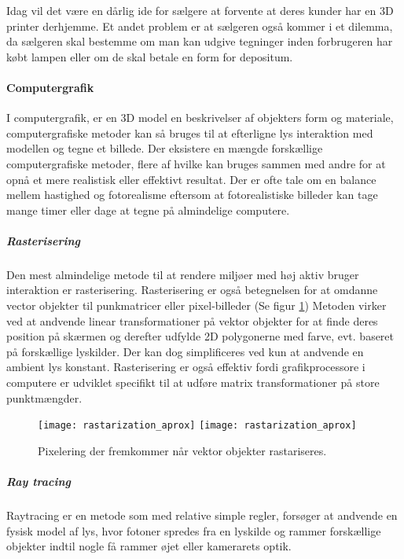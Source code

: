 Idag vil det være en dårlig ide for sælgere at forvente at deres kunder har en 3D printer derhjemme. Et andet problem er at sælgeren også kommer i et dilemma, da sælgeren skal bestemme om man kan udgive tegninger inden forbrugeren har købt lampen eller om de skal betale en form for depositum.

\paragraph{Computergrafik \cite{computergrafik_introduktion}}
I computergrafik, er en 3D model en beskrivelser af objekters form og materiale, computergrafiske metoder kan så bruges til at efterligne lys interaktion med modellen og tegne et billede. Der eksistere en mængde forskællige computergrafiske metoder, flere af hvilke kan bruges sammen med andre for at opnå et mere realistisk eller effektivt resultat. Der er ofte tale om en balance mellem hastighed og fotorealisme eftersom at fotorealistiske billeder kan tage mange timer eller dage at tegne på almindelige computere.

\subparagraph{Rasterisering}
Den mest almindelige metode til at rendere miljøer med høj aktiv bruger interaktion er rasterisering. Rasterisering er også betegnelsen for at omdanne vector objekter til punkmatricer eller pixel-billeder (Se figur \ref{fig:pixelering}) Metoden virker ved at andvende linear transformationer på vektor objekter for at finde deres position på skærmen og derefter udfylde 2D polygonerne med farve, evt. baseret på forskællige lyskilder. Der kan dog simplificeres ved kun at andvende en ambient lys konstant. Rasterisering er også effektiv fordi grafikprocessore i computere er udviklet specifikt til at udføre matrix transformationer på store punktmængder.
\begin{figure}[H]
    \centering
    \texttt{[image: rastarization\_aprox]}
    \texttt{[image: rastarization\_aprox]}
    \caption{Pixelering der fremkommer når vektor objekter rastariseres.}
    \label{fig:pixelering}
\end{figure}
\subparagraph{Ray tracing \cite{raytracing_for_begyndere}}
Raytracing er en metode som med relative simple regler, forsøger at andvende en fysisk model af lys, hvor fotoner spredes fra en lyskilde og rammer forskællige objekter indtil nogle få rammer øjet eller kamerarets optik. 

